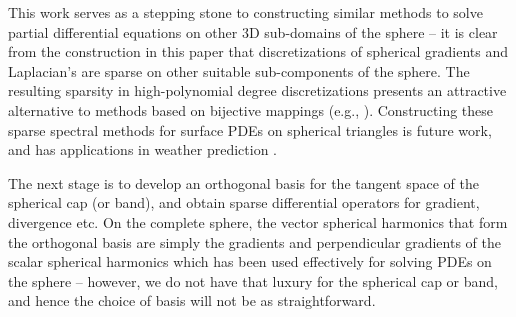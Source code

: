 \documentclass[11pt, oneside]{article}   	%
\begin{document}
This work serves as a stepping stone to constructing similar methods to solve partial differential equations on other 3D sub-domains of the sphere -- it is clear from the construction in this paper that discretizations of spherical gradients and Laplacian's are sparse on other suitable sub-components of the sphere. The resulting sparsity in high-polynomial degree discretizations presents an attractive alternative to methods based on bijective mappings (e.g., \cite{DGShallowWater,FEMShallowWater,boyd2005sphere}). Constructing these sparse spectral methods for surface PDEs on  spherical triangles is future work, and has applications in weather prediction \cite{staniforth2012horizontal}.

The next stage is to develop an orthogonal basis for the tangent space of the spherical cap (or band), and obtain sparse differential operators for gradient, divergence etc. On the complete sphere, the vector spherical harmonics that form the orthogonal basis are simply the gradients and perpendicular gradients of the scalar spherical harmonics \cite{barrera1985vector} which has been used effectively for solving PDEs on the sphere \cite{vasil2019tensor,lecoanet2019tensor} -- however, we do not have that luxury for the spherical cap or band, and hence the choice of basis will not be as straightforward.


\end{document}

